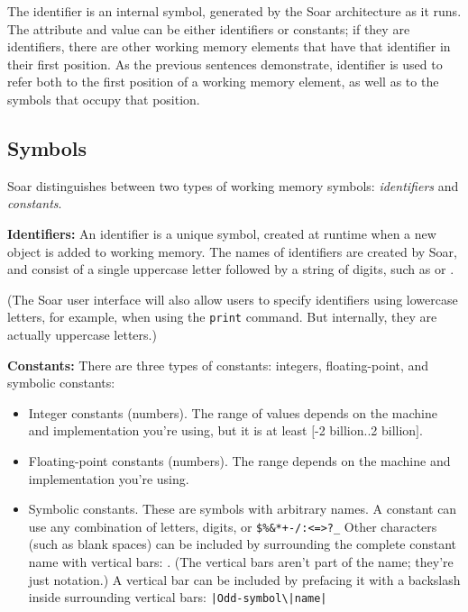 The identifier is an internal symbol, generated by the Soar architecture as
it runs. The attribute and value can be either identifiers or constants; if
they are identifiers, there are other working memory elements that have 
that identifier in their first position.  As the previous sentences
demonstrate, identifier is used to refer both to the first position of
a working memory element, as well as to the symbols that occupy that position.


\subsection{Symbols}
\label{SYNTAX-wm-symbols}

Soar distinguishes between two types of working memory symbols:
\emph{identifiers} and {\em constants}. 

\textbf{Identifiers: } An identifier is a unique symbol, created at runtime when 
a new object is added to working memory. The names of 
identifiers are
created by Soar, and consist of a single uppercase letter followed by a string
of digits, such as  or .

(The Soar user interface will also allow users to specify identifiers using
lowercase letters, for example, when using the \texttt{print} command.
But internally, they are actually uppercase letters.)

\textbf{Constants: } There are three types of constants: integers,
floating-point, and symbolic constants:\vspace{-10pt}
\begin{itemize} 

\item Integer constants (numbers).  The range of values depends on the
        machine and implementation you're using, but it is at least $[$-2
        billion..2 billion$]$.\vspace{-8pt}

\item Floating-point constants (numbers).  The range depends on
        the machine and implementation you're using.\vspace{-8pt}
        
\item Symbolic constants.  These are symbols with arbitrary names. A constant
        can use any combination of letters, digits, or \verb.$%&*+-/:<=>?_.
        Other characters (such as blank spaces) can be included by surrounding
        the complete constant name with vertical bars: .  (The vertical bars aren't part of the name; they're just
        notation.)  A vertical bar can be included by prefacing it with a
        backslash inside surrounding vertical bars:
        \verb.|Odd-symbol\|name|.\vspace{-8pt}
\end{itemize} 

